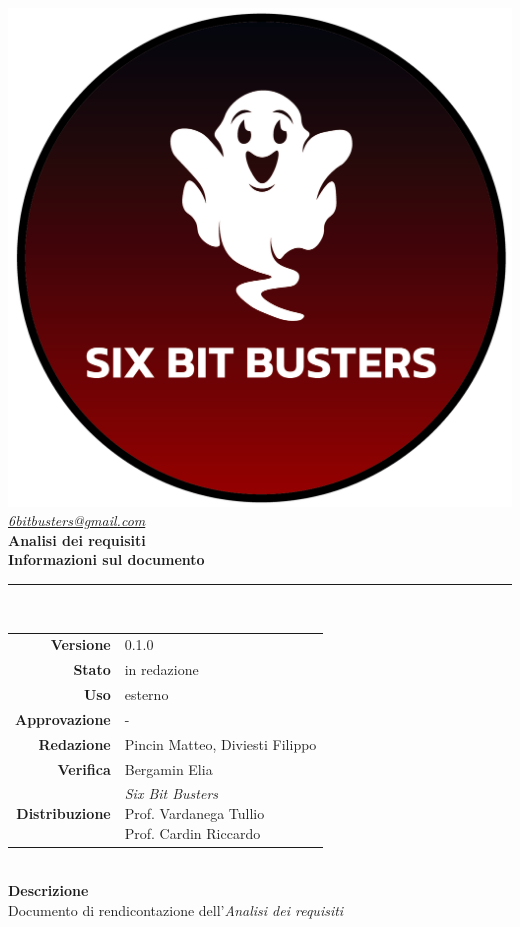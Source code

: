 \thispagestyle{empty}
\renewcommand{\arraystretch}{1.3}


\begin{titlepage}
	\begin{center}
		
	\includegraphics[scale = 0.7]{template/images/logo-circle.png}
	\\[1cm]
	\href{mailto:6bitbusters@gmail.com}		      	
	{\large{\textit{6bitbusters@gmail.com} } }\\[1cm]
	
	\Huge \textbf{Analisi dei requisiti} \\[1cm]

	\large \textbf{Informazioni sul documento} \\
	\rule{0.6\textwidth}{0.4pt}
	\\[0.5cm]
	\begin{tabular}{r|l}
		\textbf{Versione} & 0.1.0\\
		\textbf{Stato} & in redazione\\
		\textbf{Uso} & esterno\\                         
		\textbf{Approvazione} & -\\                      
		\textbf{Redazione} & Pincin Matteo, Diviesti Filippo\\ 
		\textbf{Verifica} & Bergamin Elia\\                         
		\textbf{Distribuzione} & \parbox[t]{5cm}{ \textit{Six Bit Busters} \\ Prof. Vardanega Tullio 
	 \\ Prof. Cardin Riccardo}
	\end{tabular}	
	\\[1.2cm]

	\large \textbf{Descrizione} \\ Documento di rendicontazione dell'\textit{Analisi dei requisiti}
	
	
	\end{center}
\end{titlepage}
